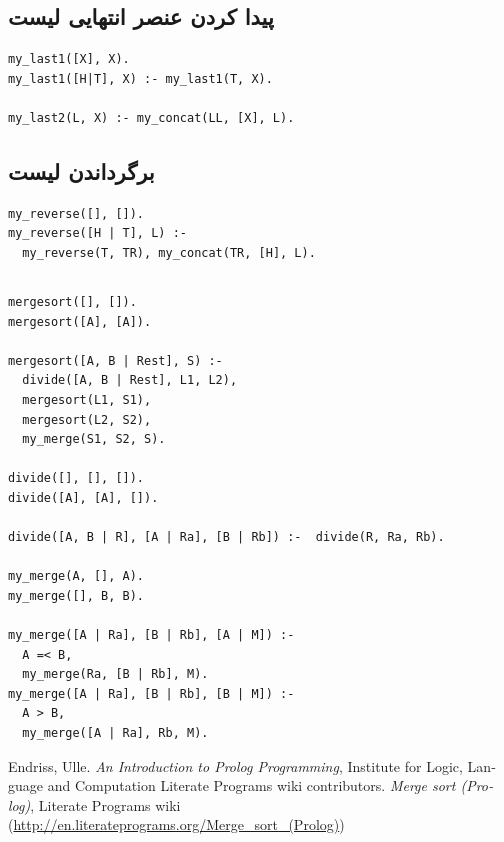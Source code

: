 \documentclass{article}
\begin{document}
\subsection{پیدا کردن عنصر انتهایی لیست}
\begin{verbatim}
my_last1([X], X).
my_last1([H|T], X) :- my_last1(T, X).

my_last2(L, X) :- my_concat(LL, [X], L).
\end{verbatim}
\subsection{برگرداندن لیست}
\begin{verbatim}
my_reverse([], []).
my_reverse([H | T], L) :-
  my_reverse(T, TR), my_concat(TR, [H], L).
\end{verbatim}
\clearpage
\subsection{}
\begin{verbatim}
mergesort([], []).
mergesort([A], [A]).

mergesort([A, B | Rest], S) :-
  divide([A, B | Rest], L1, L2),
  mergesort(L1, S1),
  mergesort(L2, S2),
  my_merge(S1, S2, S).

divide([], [], []).
divide([A], [A], []).

divide([A, B | R], [A | Ra], [B | Rb]) :-  divide(R, Ra, Rb).

my_merge(A, [], A).
my_merge([], B, B).

my_merge([A | Ra], [B | Rb], [A | M]) :-
  A =< B,
  my_merge(Ra, [B | Rb], M).
my_merge([A | Ra], [B | Rb], [B | M]) :-
  A > B,
  my_merge([A | Ra], Rb, M).
\end{verbatim}

\clearpage
\begin{latin}
\begin{thebibliography}{99}
   Endriss, Ulle.
    {\em An Introduction to Prolog Programming},
    Institute for Logic, Language and Computation
   Literate Programs wiki contributors.
    {\em Merge sort (Prolog)},
    Literate Programs wiki
    (\url{http://en.literateprograms.org/Merge_sort_(Prolog)})
\end{thebibliography}
\end{latin}
\end{document}
